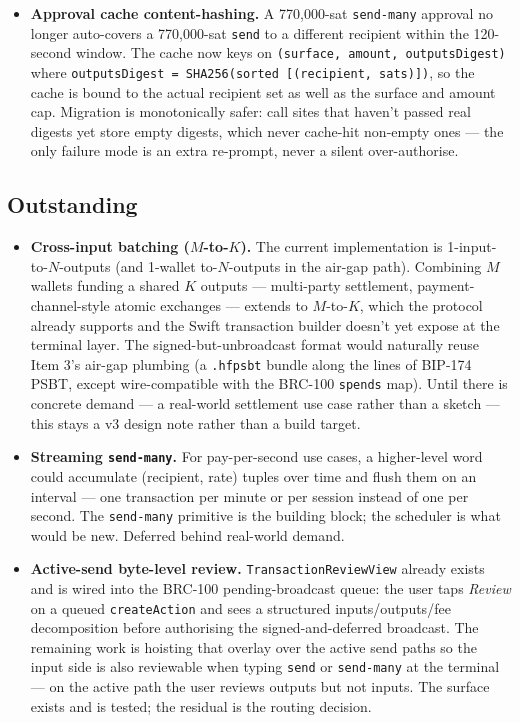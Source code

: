 \documentclass[a4paper, 11pt]{article}
\begin{document}
\begin{itemize}
\item \textbf{Approval cache content-hashing.} A 770{,}000-sat \texttt{send-many} approval no longer auto-covers a 770{,}000-sat \texttt{send} to a different recipient within the 120-second window. The cache now keys on \texttt{(surface, amount, outputsDigest)} where \texttt{outputsDigest = SHA256(sorted [(recipient, sats)])}, so the cache is bound to the actual recipient set as well as the surface and amount cap. Migration is monotonically safer: call sites that haven't passed real digests yet store empty digests, which never cache-hit non-empty ones --- the only failure mode is an extra re-prompt, never a silent over-authorise.
\end{itemize}

\subsection*{Outstanding}

\begin{itemize}
\item \textbf{Cross-input batching ($M$-to-$K$).} The current implementation is 1-input-to-$N$-outputs (and 1-wallet to-$N$-outputs in the air-gap path). Combining $M$ wallets funding a shared $K$ outputs --- multi-party settlement, payment-channel-style atomic exchanges --- extends to $M$-to-$K$, which the protocol already supports and the Swift transaction builder doesn't yet expose at the terminal layer. The signed-but-unbroadcast format would naturally reuse Item 3's air-gap plumbing (a \texttt{.hfpsbt} bundle along the lines of BIP-174 PSBT, except wire-compatible with the BRC-100 \texttt{spends} map). Until there is concrete demand --- a real-world settlement use case rather than a sketch --- this stays a v3 design note rather than a build target.
\item \textbf{Streaming \texttt{send-many}.} For pay-per-second use cases, a higher-level word could accumulate (recipient, rate) tuples over time and flush them on an interval --- one transaction per minute or per session instead of one per second. The \texttt{send-many} primitive is the building block; the scheduler is what would be new. Deferred behind real-world demand.
\item \textbf{Active-send byte-level review.} \texttt{TransactionReviewView} already exists and is wired into the BRC-100 pending-broadcast queue: the user taps \emph{Review} on a queued \texttt{createAction} and sees a structured inputs/outputs/fee decomposition before authorising the signed-and-deferred broadcast. The remaining work is hoisting that overlay over the active send paths so the input side is also reviewable when typing \texttt{send} or \texttt{send-many} at the terminal --- on the active path the user reviews outputs but not inputs. The surface exists and is tested; the residual is the routing decision.
\end{itemize}
\end{document}
